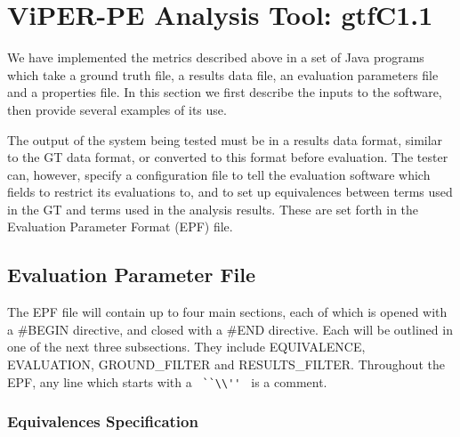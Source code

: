 


		
		

        

\section{ViPER-PE Analysis Tool: gtfC1.1}
\label{s:vipergtfc}
We have implemented the metrics described above in a set of Java
programs which take a ground truth file, a results data file, an
evaluation parameters file and a properties file.  In this section we
first describe the inputs to the software, then provide several
examples of its use.

The output of the system being tested must be in a results data
format, similar to the GT data format, or converted to this format
before evaluation.  The tester can, however, specify a configuration
file to tell the evaluation software which fields to restrict its
evaluations to, and to set up equivalences between terms used in the
GT and terms used in the analysis results.  These are set forth in the
Evaluation Parameter Format (EPF) file.

\subsection{Evaluation Parameter File}

The EPF file will contain up to four main sections, each of which is
opened with a \#BEGIN directive, and closed with a \#END directive.
Each will be outlined in one of the next three subsections.  They
include EQUIVALENCE, EVALUATION, GROUND\_FILTER and RESULTS\_FILTER.
Throughout the EPF, any line which starts with a \verb+ ``\\'' + is a
comment.

\subsubsection{Equivalences Specification}

